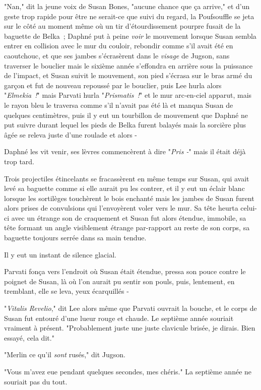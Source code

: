 "Nan," dit la jeune voix de Susan Bones, "aucune chance que ça arrive," et d'un geste trop rapide pour être ne serait-ce que suivi du regard, la Poufsouffle se jeta sur le côté au moment même où un tir d'étourdissement pourpre fusait de la baguette de Belka~; Daphné put à peine \emph{voir} le mouvement lorsque Susan sembla entrer en collision avec le mur du couloir, rebondir comme s'il avait été en caoutchouc, et que ses jambes s'écrasèrent dans le \emph{visage} de Jugson, sans traverser le bouclier mais le sixième année s'effondra en arrière sous la puissance de l'impact, et Susan suivit le mouvement, son pied s'écrasa sur le bras armé du garçon et fut de nouveau repoussé par le bouclier, puis Lee hurla alors "\emph{Elmekia~!}" mais Parvati hurla "\emph{Prismatis~!}" et le mur arc-en-ciel apparut, mais le rayon bleu le traversa comme s'il n'avait pas été là et manqua Susan de quelques centimètres, puis il y eut un tourbillon de mouvement que Daphné ne put suivre durant lequel les pieds de Belka furent balayés mais la sorcière plus âgée se releva juste d'une roulade et alors -

Daphné les vit venir, ses lèvres commencèrent à dire "\emph{Pris -}" mais il était déjà trop tard.

Trois projectiles étincelants se fracassèrent en même temps sur Susan, qui avait levé sa baguette comme si elle aurait pu les contrer, et il y eut un éclair blanc lorsque les sortilèges touchèrent le bois enchanté mais les jambes de Susan furent alors prises de convulsions qui l'envoyèrent voler vers le mur. Sa tête heurta celui-ci avec un étrange son de craquement et Susan fut alors étendue, immobile, sa tête formant un angle visiblement étrange par-rapport au reste de son corps, sa baguette toujours serrée dans sa main tendue.

Il y eut un instant de silence glacial.

Parvati fonça vers l'endroit où Susan était étendue, pressa son pouce contre le poignet de Susan, là où l'on aurait pu sentir son pouls, puis, lentement, en tremblant, elle se leva, yeux écarquillés -

"\emph{Vitalis Revelio}," dit Lee alors même que Parvati ouvrait la bouche, et le corps de Susan fut entouré d'une lueur rouge et chaude. Le septième année souriait vraiment à présent. "Probablement juste une juste clavicule brisée, je dirais. Bien essayé, cela dit."

"Merlin ce qu'il \emph{sont} rusés," dit Jugson.

"Vous m'avez eue pendant quelques secondes, mes chéris." La septième année ne souriait pas du tout.

